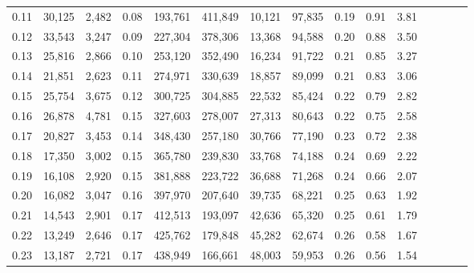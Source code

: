 \begin{tabular}{rrrcrrrrrrrrrrr}
0.11 &  30,125 &  2,482 &                                       0.08 &  193,761 &  411,849 &   10,121 &   97,835 &  0.19 &  0.91 &                         3.81 \\
0.12 &  33,543 &  3,247 &                                       0.09 &  227,304 &  378,306 &   13,368 &   94,588 &  0.20 &  0.88 &                         3.50 \\
0.13 &  25,816 &  2,866 &                                       0.10 &  253,120 &  352,490 &   16,234 &   91,722 &  0.21 &  0.85 &                         3.27 \\
0.14 &  21,851 &  2,623 &                                       0.11 &  274,971 &  330,639 &   18,857 &   89,099 &  0.21 &  0.83 &                         3.06 \\
0.15 &  25,754 &  3,675 &                                       0.12 &  300,725 &  304,885 &   22,532 &   85,424 &  0.22 &  0.79 &                         2.82 \\
0.16 &  26,878 &  4,781 &                                       0.15 &  327,603 &  278,007 &   27,313 &   80,643 &  0.22 &  0.75 &                         2.58 \\
0.17 &  20,827 &  3,453 &                                       0.14 &  348,430 &  257,180 &   30,766 &   77,190 &  0.23 &  0.72 &                         2.38 \\
0.18 &  17,350 &  3,002 &                                       0.15 &  365,780 &  239,830 &   33,768 &   74,188 &  0.24 &  0.69 &                         2.22 \\
0.19 &  16,108 &  2,920 &                                       0.15 &  381,888 &  223,722 &   36,688 &   71,268 &  0.24 &  0.66 &                         2.07 \\
0.20 &  16,082 &  3,047 &                                       0.16 &  397,970 &  207,640 &   39,735 &   68,221 &  0.25 &  0.63 &                         1.92 \\
0.21 &  14,543 &  2,901 &                                       0.17 &  412,513 &  193,097 &   42,636 &   65,320 &  0.25 &  0.61 &                         1.79 \\
0.22 &  13,249 &  2,646 &                                       0.17 &  425,762 &  179,848 &   45,282 &   62,674 &  0.26 &  0.58 &                         1.67 \\
0.23 &  13,187 &  2,721 &                                       0.17 &  438,949 &  166,661 &   48,003 &   59,953 &  0.26 &  0.56 &                         1.54 \\

\end{tabular}
